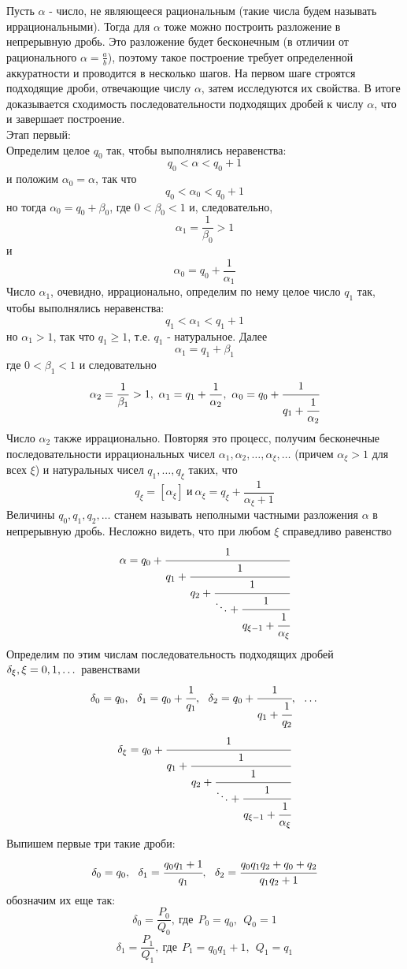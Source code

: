\documentclass[a4paper, 12pt]{article}
\theoremstyle{definition}
\begin{document}
    Пусть $\alpha$ - число, не являющееся рациональным (такие числа будем называть иррациональными). Тогда для $\alpha$ тоже можно построить разложение в непрерывную дробь. Это разложение будет бесконечным (в отличии от рационального $\alpha=\frac{a}{b}$), поэтому такое построение требует определенной аккуратности и проводится в несколько шагов. На первом шаге строятся подходящие дроби, отвечающие числу $\alpha$, затем исследуются их свойства. В итоге доказывается сходимость последовательности подходящих дробей к числу $\alpha$, что и завершает построение.\\
    Этап первый:\\
    Определим целое $q_0$ так, чтобы выполнялись неравенства: \[q_0<\alpha<q_0+1\] и положим $\alpha_0=\alpha$, так что \[q_0<\alpha_0<q_0+1\] но тогда $\alpha_0=q_0+\beta_0$, где $0<\beta_0<1$ и, следовательно, \[\alpha_1=\frac{1}{\beta_0}>1\] и \[\alpha_0=q_0+\frac{1}{\alpha_1}\] Число $\alpha_1$, очевидно, иррационально, определим по нему целое число $q_1$ так, чтобы выполнялись неравенства: \[q_1<\alpha_1<q_1+1\] но $\alpha_1>1$, так что $q_1\geq 1$, т.е. $q_1$ - натуральное. Далее \[\alpha_1=q_1+\beta_1\] где $0<\beta_1<1$ и следовательно \[\alpha_2=\frac{1}{\beta_1}>1,\ \alpha_1=q_1+\frac{1}{\alpha_2},\ \alpha_0=q_0+\cfrac{1}{q_1+\cfrac{1}{\alpha_2}}\] Число $\alpha_2$ также иррационально. Повторяя это процесс, получим бесконечные последовательности иррациональных чисел $\alpha_1, \alpha_2,\dots, \alpha_{\xi},\dots$ (причем $\alpha_{\xi}>1$ для всех $\xi$) и натуральных чисел $q_1,\dots, q_{\xi}$ таких, что \[q_{\xi}=[\alpha_{\xi}]\ \text{и} \ \alpha_{\xi}=q_{\xi}+\frac{1}{\alpha_{\xi}+1}\] 
    Величины $q_0,q_1,q_2,\dots$ станем называть неполными частными разложения $\alpha$ в непрерывную дробь.
    Несложно видеть, что при любом $\xi$ справедливо равенство \[\alpha=q_0+\cfrac{1}{q_1+\cfrac{1}{q_2+\cfrac{1}{\ddots+\cfrac{1}{q_{\xi-1}+\cfrac{1}{\alpha_{\xi}}}}}}\]
    Определим по этим числам последовательность подходящих дробей $\delta_{\xi},\\
    \xi=0,1,\dots$ равенствами
    \[\delta_0=q_0,\ \ \delta_1=q_0+\cfrac{1}{q_1},\ \ \delta_2=q_0+\cfrac{1}{q_1+\cfrac{1}{q_2}},\ \ \dots\]
    \[\delta_{\xi}=q_0+\cfrac{1}{q_1+\cfrac{1}{q_2+\cfrac{1}{\ddots+\cfrac{1}{q_{\xi-1}+\cfrac{1}{\alpha_{\xi}}}}}}\]
    Выпишем первые три такие дроби:
    \[\delta_0=q_0,\ \ \delta_1=\cfrac{q_0 q_1+1}{q_1},\ \ \delta_2=\cfrac{q_0 q_1 q_2+q_0+q_2}{q_1 q_2+1}\]
    обозначим их еще так:
    \[\delta_0=\frac{P_0}{Q_0},\ \text{где}\ \ P_0=q_0,\ \ Q_0=1\]
    \[\delta_1=\frac{P_1}{Q_1},\ \text{где}\ \ P_1=q_0 q_1+1,\ \ Q_1=q_1\]
\end{document}
